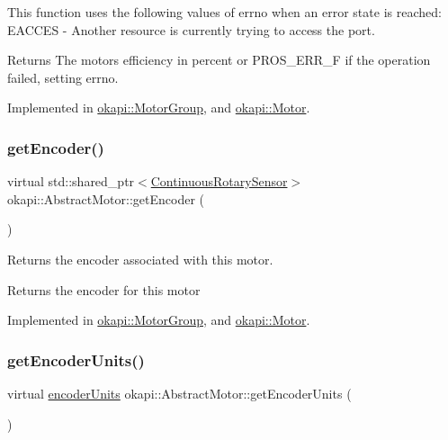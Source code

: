 This function uses the following values of errno when an error state is reached\+: E\+A\+C\+C\+ES -\/ Another resource is currently trying to access the port.

\begin{DoxyReturn}{Returns}
The motor\textquotesingle{}s efficiency in percent or P\+R\+O\+S\+\_\+\+E\+R\+R\+\_\+F if the operation failed, setting errno. 
\end{DoxyReturn}


Implemented in \mbox{\hyperlink{classokapi_1_1MotorGroup_a16413d00d77dd73b4977e8b7f73a33ce}{okapi\+::\+Motor\+Group}}, and \mbox{\hyperlink{classokapi_1_1Motor_a7703340c95e9e7dcafa243685a7d2d50}{okapi\+::\+Motor}}.

\mbox{\label{classokapi_1_1AbstractMotor_a87177280c20a855a74354dd8ba6e1d6a}} 
\subsubsection{\texorpdfstring{getEncoder()}{getEncoder()}}
{\footnotesize\ttfamily virtual std\+::shared\+\_\+ptr$<$\mbox{\hyperlink{classokapi_1_1ContinuousRotarySensor}{Continuous\+Rotary\+Sensor}}$>$ okapi\+::\+Abstract\+Motor\+::get\+Encoder (\begin{DoxyParamCaption}{ }\end{DoxyParamCaption})\hspace{0.3cm}{\ttfamily [pure virtual]}}

Returns the encoder associated with this motor.

\begin{DoxyReturn}{Returns}
the encoder for this motor 
\end{DoxyReturn}


Implemented in \mbox{\hyperlink{classokapi_1_1MotorGroup_a911d4c2a66deafb2e54f66411eceaa59}{okapi\+::\+Motor\+Group}}, and \mbox{\hyperlink{classokapi_1_1Motor_a57d8ddb900475fcfba56413e61e6e252}{okapi\+::\+Motor}}.

\mbox{\label{classokapi_1_1AbstractMotor_ae8225381a81ca0b54469949a6022b775}} 
\subsubsection{\texorpdfstring{getEncoderUnits()}{getEncoderUnits()}}
{\footnotesize\ttfamily virtual \mbox{\hyperlink{classokapi_1_1AbstractMotor_ae811cd825099f2defadeb1b7f7e7764c}{encoder\+Units}} okapi\+::\+Abstract\+Motor\+::get\+Encoder\+Units (\begin{DoxyParamCaption}{ }\end{DoxyParamCaption})\hspace{0.3cm}{\ttfamily [pure virtual]}}

